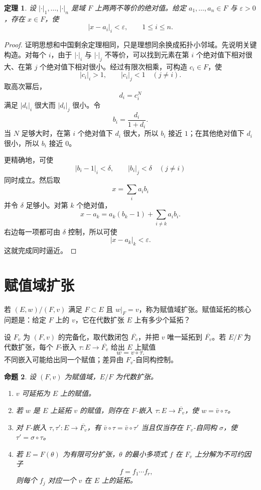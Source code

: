 \documentclass[11pt,a4paper,openany]{ctexbook}
\numberwithin{equation}{chapter}
\theoremstyle{plain}
\newtheorem{theorem}{定理}[chapter]
\newtheorem{proposition}[theorem]{命题}
\theoremstyle{definition}
\theoremstyle{remark}
\begin{document}
\begin{theorem}
设 $|\cdot|_1,\dots,|\cdot|_n$ 是域 $F$ 上两两不等价的绝对值。给定 $a_1,\dots,a_n\in F$ 与 $\varepsilon>0$，存在 $x\in F$，使
\[
|x-a_i|_i<\varepsilon,\qquad 1\le i\le n.
\]
\end{theorem}

\begin{proof}
证明思想和中国剩余定理相同，只是理想同余换成拓扑小邻域。先说明关键构造。对每个 $i$，由于 $|\cdot|_i$ 与 $|\cdot|_j$ 不等价，可以找到元素在第 $i$ 个绝对值下相对很大、在第 $j$ 个绝对值下相对很小。经过有限次相乘，可构造 $c_i\in F$，使
\[
|c_i|_i>1,\qquad |c_i|_j<1\quad(j\ne i).
\]
取高次幂后，
\[
d_i=c_i^N
\]
满足 $|d_i|_i$ 很大而 $|d_i|_j$ 很小。令
\[
b_i=\frac{d_i}{1+d_i}.
\]
当 $N$ 足够大时，在第 $i$ 个绝对值下 $d_i$ 很大，所以 $b_i$ 接近 $1$；在其他绝对值下
$d_i$ 很小，所以 $b_i$ 接近 $0$。

更精确地，可使
\[
|b_i-1|_i<\delta,\qquad |b_i|_j<\delta\quad(j\ne i)
\]
同时成立。然后取
\[
x=\sum_i a_i b_i
\]
并令 $\delta$ 足够小。对第 $k$ 个绝对值，
\[
x-a_k=a_k(b_k-1)+\sum_{i\ne k}a_i b_i.
\]
右边每一项都可由 $\delta$ 控制，所以可使
\[
|x-a_k|_k<\varepsilon.
\]
这就完成同时逼近。
\end{proof}

\section{赋值域扩张}

若 $(E,w)/(F,v)$ 满足 $F\subset E$ 且 $w|_F=v$，称为赋值域扩张。赋值延拓的核心问题是：给定 $F$ 上的 $v$，它在代数扩张 $E$ 上有多少个延拓？

设 $F_v$ 为 $(F,v)$ 的完备化，取代数闭包 $\overline{F_v}$，并把 $v$ 唯一延拓到 $\overline{F_v}$。若 $E/F$ 为代数扩张，每个 $F$-嵌入 $\tau:E\to\overline{F_v}$ 给出 $E$ 上赋值
\[
w=v\circ\tau.
\]
不同嵌入可能给出同一个赋值；差异由 $F_v$-自同构控制。

\begin{proposition}
设 $(F,v)$ 为赋值域，$E/F$ 为代数扩张。
\begin{enumerate}[label=(\arabic*)]
\item $v$ 可延拓为 $E$ 上的赋值。
\item 若 $w$ 是 $E$ 上延拓 $v$ 的赋值，则存在 $F$-嵌入 $\tau:E\to\overline{F_v}$，使 $w=\bar v\circ\tau$。
\item 对 $F$-嵌入 $\tau,\tau':E\to\overline{F_v}$，有 $\bar v\circ\tau=\bar v\circ\tau'$ 当且仅当存在 $F_v$-自同构 $\sigma$，使 $\tau'=\sigma\circ\tau$。
\item 若 $E=F(\theta)$ 为有限可分扩张，$\theta$ 的最小多项式 $f$ 在 $F_v$ 上分解为不可约因子
\[
f=f_1\cdots f_r,
\]
则每个 $f_j$ 对应一个 $v$ 在 $E$ 上的延拓。
\end{enumerate}
\end{proposition}
\end{document}
